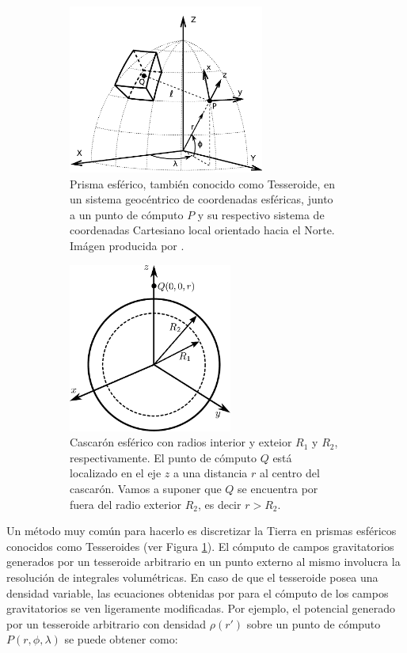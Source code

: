 \documentclass[a4paper,10pt]{article}
\begin{document}
\begin{figure}
    \begin{subfigure}[t]{0.5\textwidth}
    \centering
    \includegraphics[height=15em]{../manuscript/figures/tesseroid-uieda.pdf}
    \caption{
        Prisma esférico, también conocido como Tesseroide, en un sistema geocéntrico de coordenadas esféricas, junto a un punto de cómputo $P$ y su respectivo sistema de coordenadas Cartesiano local orientado hacia el Norte. Imágen producida por \citet{Uieda2015}.
    }
    \label{fig:tesseroid-uieda}
    \end{subfigure}
    \quad
    \begin{subfigure}[t]{0.5\textwidth}
    \centering
    \includegraphics[height=15em]{../manuscript/figures/spherical-shell.pdf}
    \caption{
        Cascarón esférico con radios interior y exteior $R_1$ y $R_2$, respectivamente. El punto de cómputo $Q$ está localizado en el eje $z$ a una distancia $r$ al centro del cascarón. Vamos a suponer que $Q$ se encuentra por fuera del radio exterior $R_2$, es decir $r > R_2$.
    }
    \label{fig:spherical-shell}
    \end{subfigure}
    \caption{}
\end{figure}

Un método muy común para hacerlo es discretizar la Tierra en prismas esféricos conocidos como Tesseroides (ver Figura \ref{fig:tesseroid-uieda}).
El cómputo de campos gravitatorios generados por un tesseroide arbitrario en un punto externo al mismo involucra la resolución de integrales volumétricas.
En caso de que el tesseroide posea una densidad variable, las ecuaciones obtenidas por \citet{Grombein2013} \citep[ver también][]{Uieda2016} para el cómputo de los campos gravitatorios se ven ligeramente modificadas. Por ejemplo, el potencial generado por un tesseroide arbitrario con densidad $\rho(r')$ sobre un punto de cómputo $P(r, \phi, \lambda)$ se puede obtener como:
\end{document}

